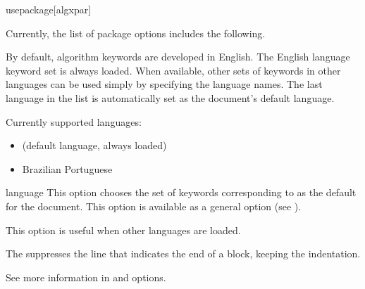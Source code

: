 \documentclass[a4paper, 11pt]{article}
\begin{document}
\begin{macro*}{usepackage}{}[algxpar]

    Currently, the list of package options includes the following.

    \begin{option*}{}
        By default, algorithm keywords are developed in English. The English language keyword set is always loaded. When available, other sets of keywords in other languages can be used simply by specifying the language names. The last language in the list is automatically set as the document's default language.

        Currently supported languages:
        \begin{itemize}
            \item {} (default language, always loaded)
            \item {} Brazilian Portuguese
        \end{itemize}
    \end{option*}

    \begin{latexcode}
        \usepackage[brazilian]{algxpar}
    \end{latexcode}

    \begin{optionnoind}{language}{}
        This option chooses the set of keywords corresponding to  as the default for the document. This option is available as a general option (see ).

        This option is useful when other languages are loaded.
    \end{optionnoind}

    \begin{latexcode}
        \usepackage[brazilian, language = english]{algxpar}
    \end{latexcode}

    \begin{option*}{}
        The  suppresses the line that indicates the end of a block, keeping the indentation.

        See more information in  and  options.
    \end{option*}

    \begin{latexcode}
        \usepackage[noend]{algxpar}
    \end{latexcode}
\end{macro*}
\end{document}
